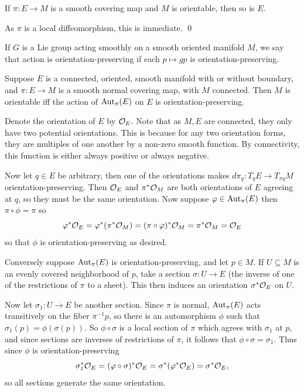     If $\pi\colon E\to M$ is a smooth covering map and $M$ is orientable, then so is $E$.

\eprop

\bproof

    As $\pi$ is a local diffeomorphism, this is immediate.
    \qed

\eproof

\bdefn

    If $G$ is a Lie group acting smoothly on a smooth oriented manifold $M$, we say that action is
    {\emphcolor orientation-preserving} if each $p\mapsto gp$ is orientation-preserving.

\edefn

\bthrm

    Suppose $E$ is a connected, oriented, smooth manifold with or without boundary, and $\pi\colon E\to M$ is a smooth
    normal covering map, with $M$ connected.
    Then $M$ is orientable iff the action of ${\rm Aut}_\pi(E)$ on $E$ is orientation-preserving.

\ethrm

\bproof

    Denote the orientation of $E$ by ${{\cal O}}_E$.
    Note that as $M,E$ are connected, they only have two potential orientations.
    This is because for any two orientation forms, they are multiples of one another by a non-zero smooth function.
    By connectivity, this function is either always positive or always negative.

    Now let $q\in E$ be arbitrary, then one of the orientations makes $d\pi_q\colon T_qE\to T_{\pi q}M$ orientation-preserving.
    Then ${{\cal O}}_E$ and $\pi^*{{\cal O}}_M$ are both orientations of $E$ agreeing at $q$, so they must be the same orientation.
    Now suppose $\varphi\in{\rm Aut}_\pi(E)$ then $\pi\circ\phi=\pi$ so
    $$ \varphi^*{{\cal O}}_E = \varphi^*(\pi^*{{\cal O}}_M) = (\pi\circ\varphi)^*{{\cal O}}_M = \pi^*{{\cal O}}_M = {{\cal O}}_E $$
    so that $\phi$ is orientation-preserving as desired.

    Conversely suppose ${\rm Aut}_\pi(E)$ is orientation-preserving, and let $p\in M$.
    If $U\subseteq M$ is an evenly covered neighborhood of $p$, take a section $\sigma\colon U\to E$ (the inverse of one
    of the restrictions of $\pi$ to a sheet).
    This then induces an orientation $\sigma^*{{\cal O}}_E$ on $U$.

    Now let $\sigma_1\colon U\to E$ be another section.
    Since $\pi$ is normal, ${\rm Aut}_\pi(E)$ acts transitively on the fiber $\pi^{-1}p$, so there is an automorphism $\phi$ such
    that $\sigma_1(p)=\phi(\sigma(p))$.
    So $\phi\circ\sigma$ is a local section of $\pi$ which agrees with $\sigma_1$ at $p$, and since sections are
    inverses of restrictions of $\pi$, it follows that $\phi\circ\sigma=\sigma_1$.
    Thus since $\phi$ is orientation-preserving
    $$ \sigma_1^*{{\cal O}}_E = (\varphi\circ\sigma)^*{{\cal O}}_E = \sigma^*(\varphi^*{{\cal O}}_E) = \sigma^*{{\cal O}}_E , $$
    so all sections generate the same orientation.

